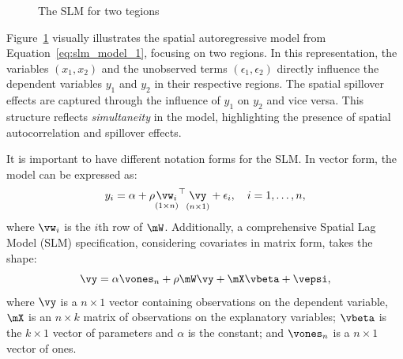 \documentclass[english,12pt]{book}\usepackage[]{graphicx}\usepackage[]{xcolor}
\begin{document}
\begin{figure}[ht]
	\caption{The SLM for two tegions}\label{figure:slm}
		\centering
\end{figure}

Figure~\ref{figure:slm} visually illustrates the spatial autoregressive model from Equation~\eqref{eq:slm_model_1}, focusing on two regions. In this representation, the variables $(x_1, x_2)$ and the unobserved terms $(\epsilon_1, \epsilon_2)$ directly influence the dependent variables $y_1$ and $y_2$ in their respective regions. The spatial spillover effects are captured through the influence of $y_1$ on $y_2$ and vice versa. This structure reflects \emph{simultaneity} in the model, highlighting the presence of spatial autocorrelation and spillover effects.

It is important to have different notation forms for the SLM. In vector form, the model can be expressed as:
\begin{equation*}
y_i = \alpha + \rho \underset{(1\times n)}{\vw_i}^\top \underset{(n\times 1)}{\vy} + \epsilon_i, \quad i = 1,\ldots,n,
\end{equation*}
%
where $\vw_i$ is the $i$th row of $\mW$. Additionally, a comprehensive Spatial Lag Model (SLM) specification, considering covariates in matrix form, takes the shape:
\begin{equation}\label{eq:Sar}
\vy  =  \alpha \vones_n+ \rho \mW\vy + \mX\vbeta + \vepsi,
\end{equation}
%
where $\vy$ is a $n\times 1$ vector containing observations on the dependent variable, $\mX$ is an $n\times k$ matrix of observations on the explanatory variables; $\vbeta$ is the $k\times 1$ vector of parameters and $\alpha$ is the constant; and $\vones_n$ is a $n\times 1$ vector of ones.
\end{document}

